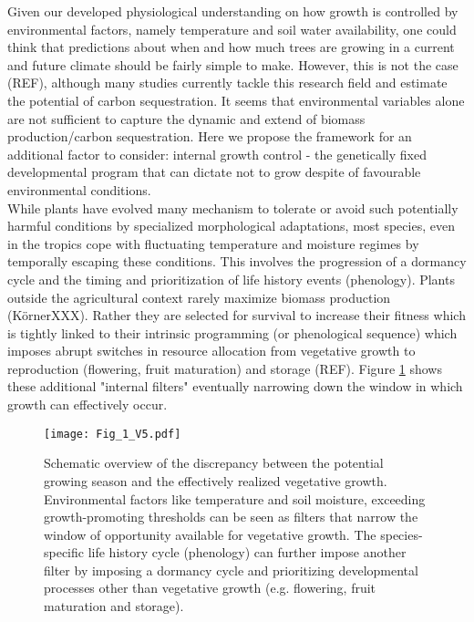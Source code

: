 \documentclass{article}
\begin{document}
		Given our developed physiological understanding on how growth is controlled by environmental factors, namely temperature and soil water availability, one could think that predictions about when and how much trees are growing in a current and future climate should be fairly simple to make. However, this is not the case (REF), although many studies currently tackle this research field and estimate the potential of carbon sequestration. It seems that environmental variables alone are not sufficient to capture the dynamic and extend of biomass production/carbon sequestration.  Here we propose the framework for an additional factor to consider: internal growth control - the genetically fixed developmental program that can dictate not to grow despite of favourable environmental conditions.\\
		
		While plants have evolved many mechanism to tolerate or avoid such potentially harmful conditions by specialized morphological adaptations, most species, even in the tropics cope with fluctuating temperature and moisture regimes by temporally escaping these conditions. This involves the progression of a dormancy cycle and the timing and prioritization of life history events (phenology). Plants outside the agricultural context rarely maximize biomass production (KörnerXXX). Rather they are selected for survival to increase their fitness which is tightly linked to their intrinsic programming (or phenological sequence) which imposes abrupt switches in resource allocation from vegetative growth to reproduction (flowering, fruit maturation) and storage (REF). Figure \ref{fig:fig_1xxx} shows these additional "internal filters" eventually narrowing down the window in which growth can effectively occur.\\

								\begin{figure}
								\centering
								\texttt{[image: Fig\_1\_V5.pdf]} 
								\caption{Schematic overview of the discrepancy between the potential growing season and the effectively realized vegetative growth. Environmental factors like temperature and soil moisture, exceeding growth-promoting thresholds can be seen as filters that narrow the window of opportunity available for vegetative growth. The species-specific life history cycle (phenology) can further impose another filter by imposing a dormancy cycle and prioritizing developmental processes other than vegetative growth (e.g. flowering, fruit maturation and storage). }
								\label{fig:fig_1xxx}
							\end{figure}
\end{document}
